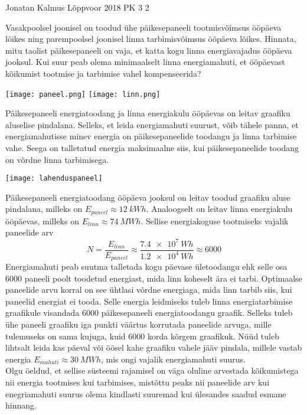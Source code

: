 {Jonatan Kalmus} %
{Lõppvoor} %
{2018} %
{PK 3} %
{2} %
{
\ifStatement
    Vasakpoolsel joonisel on toodud ühe päikesepaneeli tootmisvõimsus ööpäeva lõikes ning parempoolsel joonisel linna tarbimisvõimsus ööpäeva lõikes. Hinnata, mitu taolist päikesepaneeli on vaja, et katta kogu linna energiavajadus ööpäeva jooksul. Kui suur peab olema minimaalselt linna energiamahuti, et ööpäevast kõikumist tootmise ja tarbimise vahel kompenseerida?

\vspace{0 pt}%
\texttt{[image: paneel.png]}%
\texttt{[image: linn.png]}%
\vspace{0 pt}%
\fi


\ifHint
Päikesepaneeli energiatoodang ja linna energiakulu ööpäevas on leitav graafiku aluselise pindalana. Selleks, et leida energiamahuti suurust, võib tähele panna, et energiamahutisse minev energia on päikesepaneelide toodangu ja linna tarbimise vahe. Seega on talletatud energia maksimaalne siis, kui päikesepaneelide toodang on võrdne linna tarbimisega.
\fi


\ifSolution
\vspace{-10 pt}%
\begin{center}
\texttt{[image: lahenduspaneel]}%
\end{center}
\vspace{-10 pt}%
Päikesepaneeli energiatoodang ööpäeva jooksul on leitav toodud graafiku aluse pindalana, milleks on $E_{paneel} \approx \SI{12}{kWh}$. Analoogselt on leitav linna energiakulu ööpäevas, milleks on $E_{linn} \approx \SI{74}{MWh}$. Sellise energiakoguse tootmiseks vajalik paneelide arv $$N = \frac{E_{linn}}{E_{paneel}} \approx \frac{\SI{7.4e7}{Wh}}{\SI{1.2e4}{Wh}} \approx \num{6000}$$
Energiamahuti peab suutma talletada kogu päevase ületoodangu ehk selle osa 6000 paneeli poolt toodetud energiast, mida linn koheselt ära ei tarbi. Optimaalse paneelide arvu korral on see ühtlasi võrdne energiaga, mida linn tarbib siis, kui paneelid energiat ei tooda. Selle energia leidmiseks tuleb linna energiatarbimise graafikule visandada 6000 päikesepaneeli energiatoodangu graafik. Selleks tuleb ühe paneeli graafiku iga punkti väärtus korrutada paneelide arvuga, mille tulemuseks on sama kujuga, kuid 6000 korda kõrgem graafikuk. Nüüd tuleb lihtsalt leida kas päeval või öösel kahe graafiku vahele jääv pindala, millele vastab energia $E_{mahuti} \approx \SI{30}{MWh}$, mis ongi vajalik energiamahuti suurus.\\
Olgu öeldud, et sellise süsteemi rajamisel on väga oluline arvestada kõikumistega nii energia tootmises kui tarbimises, mistõttu peaks nii paneelide arv kui enegriamahuti suurus olema kindlasti suuremad kui ülesandes saadud esmane hinnang.
\fi
}